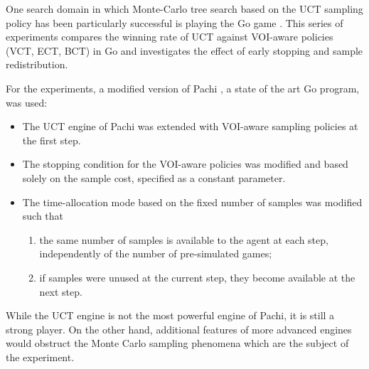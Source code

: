 \documentclass{article}
\begin{document}
One search domain in which Monte-Carlo tree search based on the UCT
sampling policy has been particularly successful is playing the Go
game \cite{Gelly.mogo}. This series of experiments compares
the winning rate of UCT against VOI-aware policies (VCT, ECT, BCT)
in Go and investigates the effect of early stopping and sample
redistribution. 

For the experiments, a modified version of Pachi \cite{Braudis.pachi},
a state of the art Go program, was used:
\begin{itemize}
\item The UCT engine of Pachi was extended with VOI-aware sampling
  policies at the first step. 
\item The stopping condition for the VOI-aware policies was
  modified and based solely on the sample cost, specified as
  a constant parameter. 
\item The time-allocation mode based on the fixed number of samples
  was modified such that 
  \begin{enumerate}
    \item the same number of samples is available to
      the agent at each step, independently of the number of pre-simulated
      games;  
    \item if samples were unused at the current step,
      they become available at the next step.
  \end{enumerate}
\end{itemize}
While the UCT engine is not the most powerful engine of Pachi, it is still
a strong player. On the other hand, additional
features of more advanced engines would obstruct the Monte Carlo
sampling phenomena which are the subject of the experiment.
\end{document}
